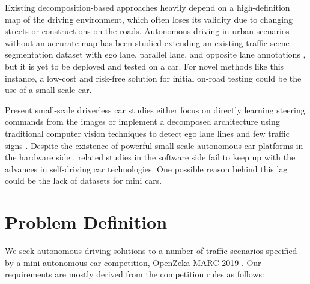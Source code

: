 Existing decomposition-based approaches heavily depend on a high-definition map
of the driving environment, which often loses its validity due to changing
streets or constructions on the roads. Autonomous driving in urban scenarios
without an accurate map has been studied extending an existing traffic scene
segmentation dataset with ego lane, parallel lane, and opposite lane
annotations \cite{Meyer2018DeepSL}, but it is yet to be deployed and tested on
a car. For novel methods like this instance, a low-cost and risk-free solution
for initial on-road testing could be the use of a small-scale car.

Present small-scale driverless car studies either focus on directly learning
steering commands from the images \cite{Bechtel2017DeepPicarAL,
Do2018RealTimeSC} or implement a decomposed architecture using traditional
computer vision techniques to detect ego lane lines and few traffic signs
\cite{Blaga2018MiniatureAV}. Despite the existence of powerful small-scale
autonomous car platforms in the hardware side \cite{Karaman2017ProjectbasedCA},
related studies in the software side fail to keep up with the advances in
self-driving car technologies. One possible reason behind this lag could be the
lack of datasets for mini cars.


\section{Problem Definition}

We seek autonomous driving solutions to a number of traffic scenarios specified
by a mini autonomous car competition, OpenZeka MARC 2019 \cite{OpenZekaMARC}.
Our requirements are mostly derived from the competition rules as follows:

